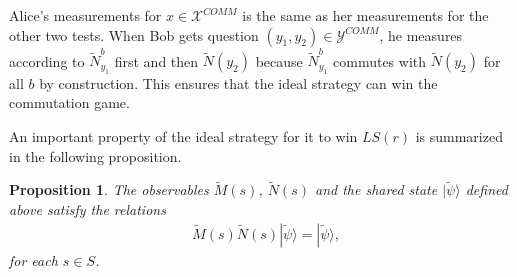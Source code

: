 \documentclass[11pt,letterpaper]{article}
\newcommand{\ket}[1]{|#1\rangle}
\newcommand{\calX}{\mathcal{X}}
\newcommand{\calY}{\mathcal{Y}}
\newcommand{\1}{\mathbb{1}}
\newcommand{\LS}{LS}
\newcommand{\COMM}{COMM}
\newcommand{\tM}{\tilde{M}}
\newcommand{\tN}{\tilde{N}}
\newcommand{\tpsi}{\tilde{\psi}}
\newtheorem{proposition}[theorem]{Proposition}
\theoremstyle{definition}
\begin{document}
Alice's measurements for $x \in \calX^{\COMM}$ is the same as her
measurements for the other two tests.
When Bob gets question $(y_1, y_2) \in \calY^{\COMM}$, he measures 
according to $\tN_{y_1}^b$ first and then $\tN(y_2)$ because $\tN_{y_1}^b$
commutes with $\tN(y_2)$ for all $b$ by construction.
This ensures that the ideal strategy can win the commutation game.


An important property of the ideal strategy for it to win $\LS(r)$ is summarized in the 
following proposition.
\begin{proposition}
The observables $\tM(s)$, $\tN(s)$
and the shared state $\ket{\tpsi}$ defined above
satisfy the relations
\begin{align}
	\label{eq:mn_preserve} &\tM(s) \tN(s) \ket{\tpsi} = \ket{\tpsi},
\end{align}
for each $s \in S$.
\end{proposition}
\end{document}
